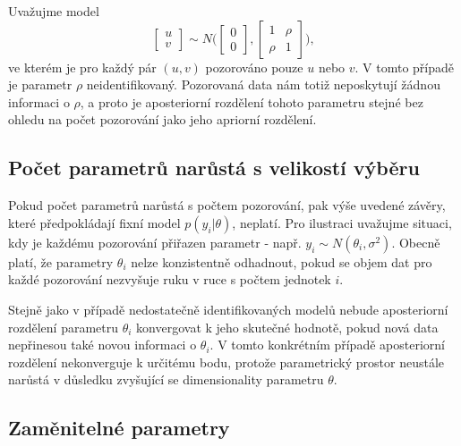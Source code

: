 Uvažujme model
\begin{equation}
\begin{bmatrix}u \\ v \end{bmatrix} \sim N \Big(\begin{bmatrix}0 \\ 0 \end{bmatrix}, \begin{bmatrix} 1 & \rho\\ \rho & 1 \end{bmatrix} \Big),
\end{equation}
ve kterém je pro každý pár $(u, v)$ pozorováno pouze $u$ nebo $v$. V tomto případě je parametr $\rho$ neidentifikovaný. Pozorovaná data nám totiž neposkytují žádnou informaci o $\rho$, a proto je aposteriorní rozdělení tohoto parametru stejné bez ohledu na počet pozorování jako jeho apriorní rozdělení.

\subsection{Počet parametrů narůstá s velikostí výběru}

Pokud počet parametrů narůstá s počtem pozorování, pak výše uvedené závěry, které předpokládají fixní model $p(y_i | \theta)$, neplatí. Pro ilustraci uvažujme situaci, kdy je každému pozorování přiřazen parametr - např. $y_i \sim N(\theta_i, \sigma^2)$. Obecně platí, že parametry $\theta_i$ nelze konzistentně odhadnout, pokud se objem dat pro každé pozorování nezvyšuje ruku v ruce s počtem jednotek $i$.

Stejně jako v případě nedostatečně identifikovaných modelů nebude aposteriorní rozdělení parametru $\theta_i$ konvergovat k jeho skutečné hodnotě, pokud nová data nepřinesou také novou informaci o $\theta_i$. V tomto konkrétním případě aposteriorní rozdělení nekonverguje k určitému bodu, protože parametrický prostor neustále narůstá v důsledku zvyšující se dimensionality parametru $\theta$.

\subsection{Zaměnitelné parametry}

